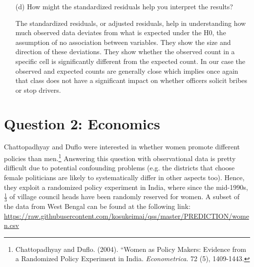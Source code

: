 \documentclass[12pt,letterpaper]{article}
\begin{document}
\begin{enumerate}
\begin{table}[h]
\begin{tabular}{l | c c c }
		\end{tabular}
	\end{table}
	
	
	\vspace{7cm}
	\item [(d)] How might the standardized residuals help you interpret the results?  

	The standardized residuals, or adjusted residuals, help in understanding how much observed data deviates from what is expected under the H0, the assumption of no association between variables. They show the size and direction of these deviations. They show whether the observed count in a specific cell is significantly different from the expected count. In our case the observed and expected counts are generally close which implies once again that class does not have a significant impact on whether officers solicit bribes or stop drivers.
	
\end{enumerate}
\newpage

\section*{Question 2: Economics}
Chattopadhyay and Duflo were interested in whether women promote different policies than men.\footnote{Chattopadhyay and Duflo. (2004). ``Women as Policy Makers: Evidence from a Randomized Policy Experiment in India. \textit{Econometrica}. 72 (5), 1409-1443.} Answering this question with observational data is pretty difficult due to potential confounding problems (e.g. the districts that choose female politicians are likely to systematically differ in other aspects too). Hence, they exploit a randomized policy experiment in India, where since the mid-1990s, $\frac{1}{3}$ of village council heads have been randomly reserved for women. A subset of the data from West Bengal can be found at the following link: \url{https://raw.githubusercontent.com/kosukeimai/qss/master/PREDICTION/women.csv}\\
\end{document}
